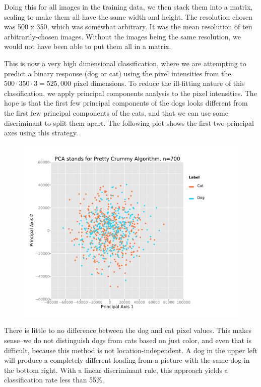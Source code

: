 \documentclass[12pt]{article}
\begin{document}
Doing this for all images in the training data, we then stack them into a matrix, scaling to make them all have the same width and height. The resolution chosen was 500 x 350, which was somewhat arbitrary. It was the mean resolution of ten arbitrarily-chosen images. Without the images being the same resolution, we would not have been able to put them all in a matrix.

This is now a very high dimensional classification, where we are attempting to predict a binary response (dog or cat) using the pixel intensities from the $500 \cdot 350 \cdot 3 = 525,000$ pixel dimensions. To reduce the ill-fitting nature of this classification, we apply principal components analysis to the pixel intensities. The hope is that the first few principal components of the dogs looks different from the first few principal components of the cats, and that we can use some discriminant to split them apart. The following plot shows the first two principal axes using this strategy.

\begin{figure}[H] \center
\includegraphics[scale=.50]{PCA_plot.pdf} 
\end{figure}

There is little to no difference between the dog and cat pixel values. This makes sense--we do not distinguish dogs from cats based on just color, and even that is difficult, because this method is not location-independent. A dog in the upper left will produce a completely different loading from a picture with the same dog in the bottom right. With a linear discriminant rule, this approach yields a classification rate less than 55\%. 
\end{document}
